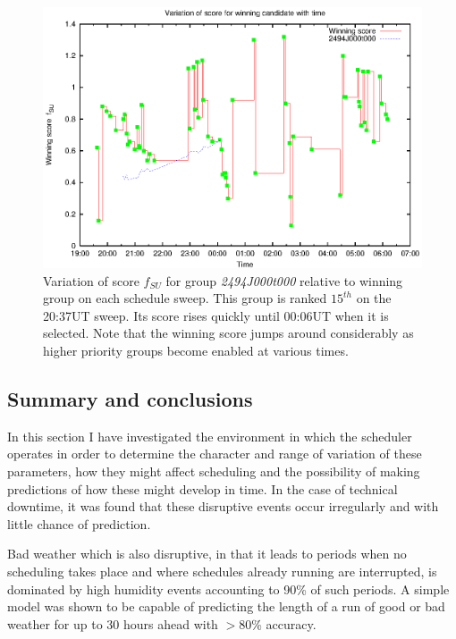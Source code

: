 {{\begin{figure}[h]
\begin{center}
  \includegraphics[scale=1.0, angle=0]{figures/winscore.eps}
  \caption[Variation of score $f_{SU}$ for group \emph{2494J000t000} relative to winning groups per sweep of scheduler.]{Variation of score $f_{SU}$ for group \emph{2494J000t000} relative to winning group on each schedule sweep. This group is ranked $15^{th}$ on the 20:37UT sweep. Its score rises quickly until 00:06UT when it is selected. Note that the winning score jumps around considerably as higher priority groups become enabled at various times.}
  \label{fig:scoreplot}
\end{center}
\end{figure}

\subsection{Summary and conclusions}
In this section I have investigated the environment in which the scheduler operates in order to determine the character and range of variation of these parameters, how they might affect scheduling and the possibility of making predictions of how these might develop in time. In the case of technical downtime, it was found that these disruptive events occur irregularly and with little chance of prediction.

Bad weather which is also disruptive, in that it leads to periods when no scheduling takes place and where schedules already running are interrupted, is dominated by high humidity events accounting to 90\% of such periods. A simple model was shown to be capable of predicting the length of a run of good or bad weather for up to 30 hours ahead with $>80$\% accuracy. 

}}
